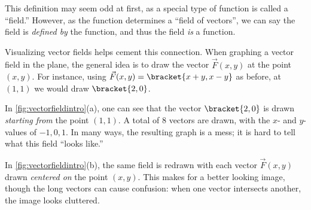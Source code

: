 This definition may seem odd at first, as a special type of function is called a ``field.'' However, as the function determines a ``field of vectors'', we can say the field is \emph{defined by} the function, and thus the field \emph{is} a function.

Visualizing vector fields helps cement this connection. When graphing a vector field in the plane, the general idea is to draw the vector $\vec F(x,y)$ at the point $(x,y)$. For instance, using $\vec F(x,y) =\bracket{x+y,x-y}$ as before, at $(1,1)$ we would draw $\bracket{2,0}$. 

In \autoref{fig:vectorfieldintro}(a), one can see that the vector $\bracket{2,0}$ is drawn \emph{starting from} the point $(1,1)$. A total of 8 vectors are drawn, with the $x$- and $y$-values of $-1,0,1$. In many ways, the resulting graph is a mess; it is hard to tell what this field ``looks like.''

In \autoref{fig:vectorfieldintro}(b), the same field is redrawn with each vector $\vec F(x,y)$ drawn \emph{centered on} the point $(x,y)$. This makes for a better looking image, though the long vectors can cause confusion: when one vector intersects another, the image looks cluttered.

